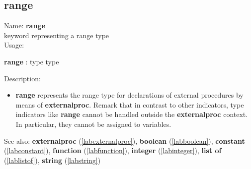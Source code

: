 \subsection{range}
\label{labrange}
\noindent Name: \textbf{range}\\
keyword representing a \textsf{range} type \\

\noindent Usage: 
\begin{center}
\textbf{range} : \textsf{type type}\\
\end{center}
\noindent Description: \begin{itemize}

\item \textbf{range} represents the \textsf{range} type for declarations
   of external procedures by means of \textbf{externalproc}.
   Remark that in contrast to other indicators, type indicators like
   \textbf{range} cannot be handled outside the \textbf{externalproc} context.  In
   particular, they cannot be assigned to variables.
\end{itemize}
See also: \textbf{externalproc} (\ref{labexternalproc}), \textbf{boolean} (\ref{labboolean}), \textbf{constant} (\ref{labconstant}), \textbf{function} (\ref{labfunction}), \textbf{integer} (\ref{labinteger}), \textbf{list of} (\ref{lablistof}), \textbf{string} (\ref{labstring})
